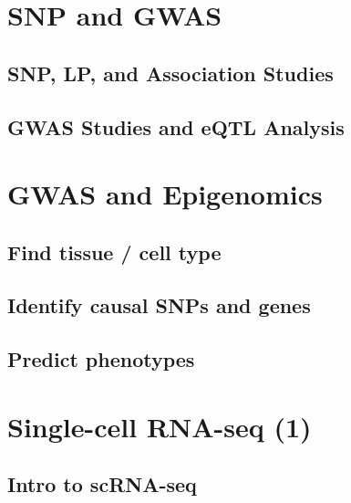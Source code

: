 \documentclass[
]{book}
\begin{document}
\hypertarget{gwas1}{%
\chapter{SNP and GWAS}\label{gwas1}}

\hypertarget{snp-lp-and-association-studies}{%
\section{SNP, LP, and Association Studies}\label{snp-lp-and-association-studies}}

\hypertarget{gwas-studies-and-eqtl-analysis}{%
\section{GWAS Studies and eQTL Analysis}\label{gwas-studies-and-eqtl-analysis}}

\hypertarget{gwas2}{%
\chapter{GWAS and Epigenomics}\label{gwas2}}

\hypertarget{find-tissue-cell-type}{%
\section{Find tissue / cell type}\label{find-tissue-cell-type}}

\hypertarget{identify-causal-snps-and-genes}{%
\section{Identify causal SNPs and genes}\label{identify-causal-snps-and-genes}}

\hypertarget{predict-phenotypes}{%
\section{Predict phenotypes}\label{predict-phenotypes}}

\hypertarget{scrna1}{%
\chapter{Single-cell RNA-seq (1)}\label{scrna1}}

\hypertarget{intro-to-scrna-seq}{%
\section{Intro to scRNA-seq}\label{intro-to-scrna-seq}}
\end{document}
